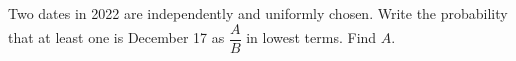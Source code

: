 Two dates in 2022 are independently and uniformly chosen. Write the probability that at least one is December 17 as $\dfrac{A}{B}$ in lowest terms. Find $A$.
